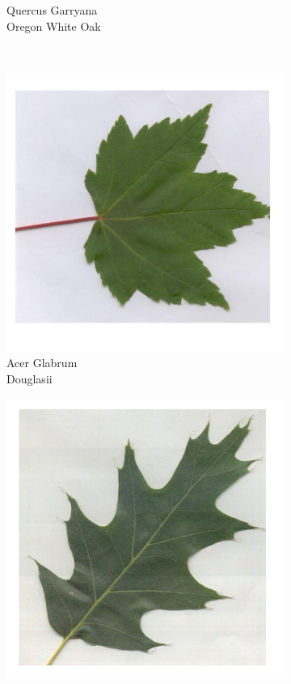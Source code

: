 \documentclass[12pt]{article}
\begin{document}
\begin{figure}[b!]
\begin{subfigure}[b]{0.3\textwidth}
\caption{Quercus Garryana\\Oregon White Oak}
\end{subfigure}\\
\begin{subfigure}[b]{0.3\textwidth}
\includegraphics[width=\textwidth]{glabrum_sample.jpg}
\caption{Acer Glabrum\\Douglasii}
\end{subfigure}
\begin{subfigure}[b]{0.3\textwidth}
\includegraphics[width=\textwidth]{kelloggii_sample.jpg}

\end{subfigure}
\end{figure}
\end{document}
